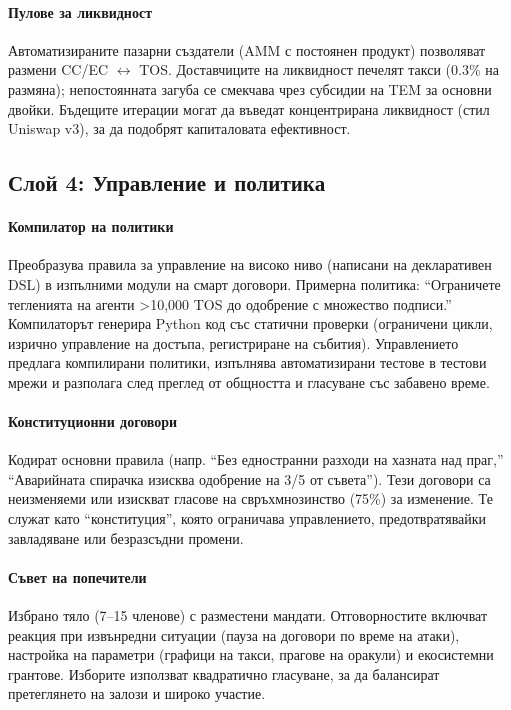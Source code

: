 \documentclass[11pt]{article}
\begin{document}
\paragraph{Пулове за ликвидност} Автоматизираните пазарни създатели (AMM с постоянен продукт) позволяват размени CC/EC $\leftrightarrow$ TOS. Доставчиците на ликвидност печелят такси (0.3\% на размяна); непостоянната загуба се смекчава чрез субсидии на TEM за основни двойки. Бъдещите итерации могат да въведат концентрирана ликвидност (стил Uniswap v3), за да подобрят капиталовата ефективност.

\subsection{Слой 4: Управление и политика}
\paragraph{Компилатор на политики} Преобразува правила за управление на високо ниво (написани на декларативен DSL) в изпълними модули на смарт договори. Примерна политика: ``Ограничете тегленията на агенти >10,000 TOS до одобрение с множество подписи.'' Компилаторът генерира Python код със статични проверки (ограничени цикли, изрично управление на достъпа, регистриране на събития). Управлението предлага компилирани политики, изпълнява автоматизирани тестове в тестови мрежи и разполага след преглед от общността и гласуване със забавено време.

\paragraph{Конституционни договори} Кодират основни правила (напр. ``Без едностранни разходи на хазната над праг,'' ``Аварийната спирачка изисква одобрение на 3/5 от съвета''). Тези договори са неизменяеми или изискват гласове на свръхмнозинство (75\%) за изменение. Те служат като ``конституция'', която ограничава управлението, предотвратявайки завладяване или безразсъдни промени.

\paragraph{Съвет на попечители} Избрано тяло (7--15 членове) с разместени мандати. Отговорностите включват реакция при извънредни ситуации (пауза на договори по време на атаки), настройка на параметри (графици на такси, прагове на оракули) и екосистемни грантове. Изборите използват квадратично гласуване, за да балансират претеглянето на залози и широко участие.
\end{document}
